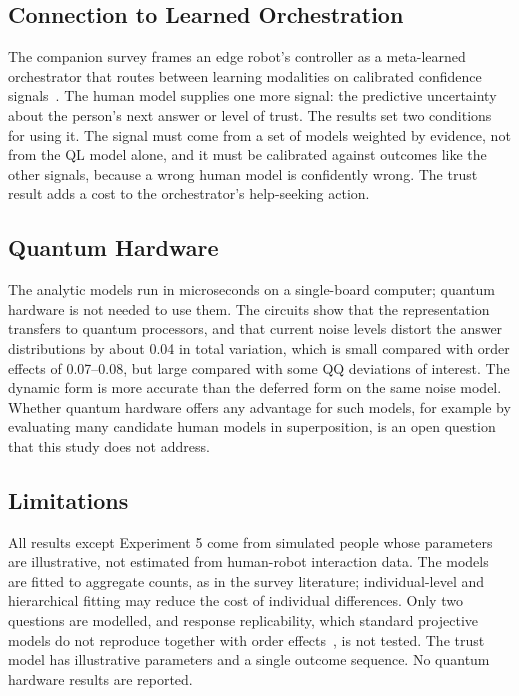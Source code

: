 \subsection{Connection to Learned Orchestration}\label{sec:robot}
The companion survey frames an edge robot's controller as a meta-learned orchestrator that routes between learning modalities on calibrated confidence signals~\cite{Guru2026s3}. The human model supplies one more signal: the predictive uncertainty about the person's next answer or level of trust. The results set two conditions for using it. The signal must come from a set of models weighted by evidence, not from the QL model alone, and it must be calibrated against outcomes like the other signals, because a wrong human model is confidently wrong. The trust result adds a cost to the orchestrator's help-seeking action.

\subsection{Quantum Hardware}
The analytic models run in microseconds on a single-board computer; quantum hardware is not needed to use them. The circuits show that the representation transfers to quantum processors, and that current noise levels distort the answer distributions by about 0.04 in total variation, which is small compared with order effects of 0.07--0.08, but large compared with some QQ deviations of interest. The dynamic form is more accurate than the deferred form on the same noise model. Whether quantum hardware offers any advantage for such models, for example by evaluating many candidate human models in superposition, is an open question that this study does not address.

\subsection{Limitations}
All results except Experiment 5 come from simulated people whose parameters are illustrative, not estimated from human-robot interaction data. The models are fitted to aggregate counts, as in the survey literature; individual-level and hierarchical fitting may reduce the cost of individual differences. Only two questions are modelled, and response replicability, which standard projective models do not reproduce together with order effects~\cite{Khrennikov2014,Ozawa2021}, is not tested. The trust model has illustrative parameters and a single outcome sequence. No quantum hardware results are reported.


